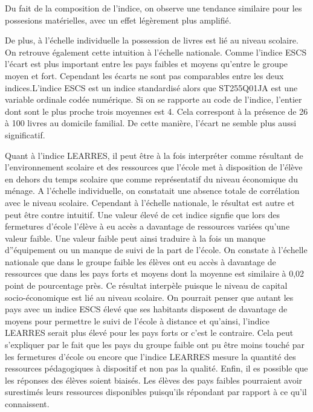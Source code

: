 \documentclass[
  french,
  11pt,
  a4paper,
]{report}
\begin{document}
Du fait de la composition de l'indice, on observe une tendance similaire
pour les possesions matérielles, avec un effet légèrement plus amplifié.

De plus, à l'échelle individuelle la possession de livres est lié au
niveau scolaire. On retrouve également cette intuition à l'échelle
nationale. Comme l'indice ESCS l'écart est plus important entre les pays
faibles et moyens qu'entre le groupe moyen et fort. Cependant les écarts
ne sont pas comparables entre les deux indices.L'indice ESCS est un
indice standardisé alors que ST255Q01JA est une variable ordinale codée
numérique. Si on se rapporte au code de l'indice, l'entier dont sont le
plus proche trois moyennes est 4. Cela correspont à la présence de 26 à
100 livres au domicile familial. De cette manière, l'écart ne semble
plus aussi significatif.

Quant à l'indice LEARRES, il peut être à la fois interpréter comme
résultant de l'environnement scolaire et des ressources que l'école met
à disposition de l'élève en dehors du temps scolaire que comme
représentatif du niveau économique du ménage. A l'échelle individuelle,
on constatait une absence totale de corrélation avec le niveau scolaire.
Cependant à l'échelle nationale, le résultat est autre et peut être
contre intuitif. Une valeur élevé de cet indice signfie que lors des
fermetures d'école l'élève à eu accès a davantage de ressources variées
qu'une valeur faible. Une valeur faible peut ainsi traduire à la fois un
manque d''équipement ou un manque de suivi de la part de l'école. On
constate à l'échelle nationale que dans le groupe faible les élèves ont
eu accès à davantage de ressources que dans les pays forts et moyens
dont la moyenne est similaire à 0,02 point de pourcentage près. Ce
résultat interpèle puisque le niveau de capital socio-économique est lié
au niveau scolaire. On pourrait penser que autant les pays avec un
indice ESCS élevé que ses habitants disposent de davantage de moyens
pour permettre le suivi de l'école à distance et qu'ainsi, l'indice
LEARRES serait plus élevé pour les pays forts or c'est le contraire.
Cela peut s'expliquer par le fait que les pays du groupe faible ont pu
être moins touché par les fermetures d'école ou encore que l'indice
LEARRES mesure la quantité des ressources pédagogiques à dispositif et
non pas la qualité. Enfin, il es possible que les réponses des élèves
soient biaisés. Les élèves des pays faibles pourraient avoir surestimés
leurs ressources disponibles puisqu'ils répondant par rapport à ce qu'il
connaissent.
\end{document}
